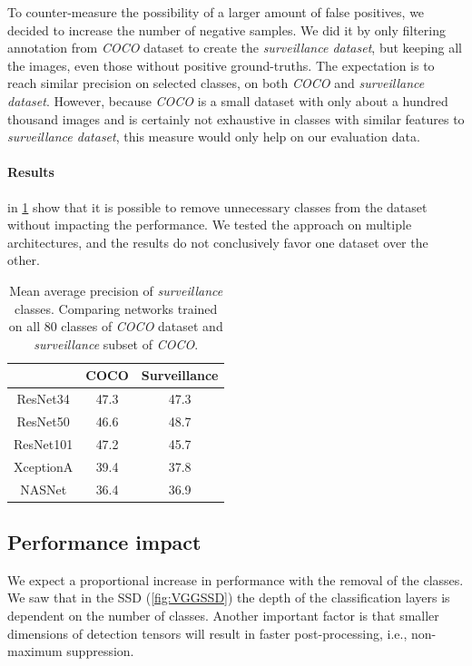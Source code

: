 To counter-measure the possibility of a larger amount of false positives, we decided to increase the number of negative samples. We did it by only filtering annotation from \textit{COCO} dataset to create the \textit{surveillance dataset}, but keeping all the images, even those without positive ground-truths. The expectation is to reach similar precision on selected classes, on both \textit{COCO} and \textit{surveillance dataset}. However, because \textit{COCO} is a small dataset with only about a hundred thousand images and is certainly not exhaustive in classes with similar features to \textit{surveillance dataset}, this measure would only help on our evaluation data.

\paragraph{Results} in \cref{tab:ssdcocosurv} show that it is possible to remove unnecessary classes from the dataset without impacting the performance. We tested the approach on multiple architectures, and the results do not conclusively favor one dataset over the other. 

\begin{table}[]
    \centering
    \begin{tabular}{c|c|c}
         & COCO & Surveillance  \\
         \hline
        ResNet34 & 47.3 & 47.3 \\
        ResNet50 & 46.6 & 48.7 \\
        ResNet101 & 47.2 & 45.7 \\
        XceptionA & 39.4 & 37.8 \\
        NASNet & 36.4 & 36.9 
    \end{tabular}
    \caption[SSD's precision comparison between COCO and surveillance datasets]{Mean average precision of \textit{surveillance} classes. Comparing networks trained on all 80 classes of \textit{COCO} dataset and \textit{surveillance} subset of \textit{COCO}.}
    \label{tab:ssdcocosurv}
\end{table}

\subsection{Performance impact}
We expect a proportional increase in performance with the removal of the classes. We saw that in the SSD (\cref{fig:VGGSSD}) the depth of the classification layers is dependent on the number of classes. Another important factor is that smaller dimensions of detection tensors will result in faster post-processing, i.e., non-maximum suppression. 

